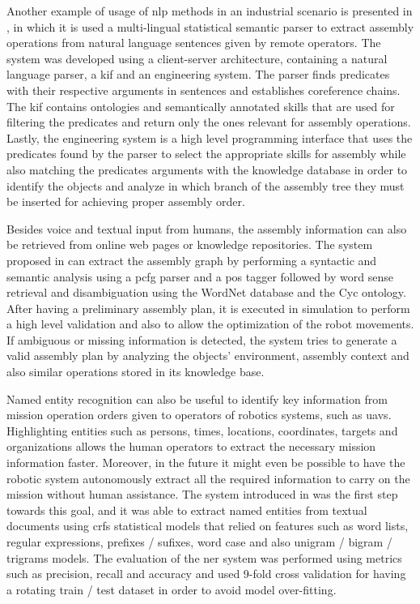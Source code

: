 Another example of usage of \gls{nlp} methods in an industrial scenario is presented in \cite{Stenmark2013}, in which it is used a multi-lingual statistical semantic parser to extract assembly operations from natural language sentences given by remote operators. The system was developed using a client-server architecture, containing a natural language parser, a \gls{kif} and an engineering system. The parser finds predicates with their respective arguments in sentences and establishes coreference chains. The \gls{kif} contains ontologies and semantically annotated skills that are used for filtering the predicates and return only the ones relevant for assembly operations. Lastly, the engineering system is a high level programming interface that uses the predicates found by the parser to select the appropriate skills for assembly while also matching the predicates arguments with the knowledge database in order to identify the objects and analyze in which branch of the assembly tree they must be inserted for achieving proper assembly order.

Besides voice and textual input from humans, the assembly information can also be retrieved from online web pages or knowledge repositories. The system proposed in \cite{Tenorth2010} can extract the assembly graph by performing a syntactic and semantic analysis using a \gls{pcfg} parser and a \gls{pos} tagger followed by word sense retrieval and disambiguation using the WordNet database and the Cyc ontology. After having a preliminary assembly plan, it is executed in simulation to perform a high level validation and also to allow the optimization of the robot movements. If ambiguous or missing information is detected, the system tries to generate a valid assembly plan by analyzing the objects' environment, assembly context and also similar operations stored in its knowledge base.

Named entity recognition can also be useful to identify key information from mission operation orders given to operators of robotics systems, such as \glspl{uav}. Highlighting entities such as persons, times, locations, coordinates, targets and organizations allows the human operators to extract the necessary mission information faster. Moreover, in the future it might even be possible to have the robotic system autonomously extract all the required information to carry on the mission without human assistance. The system introduced in \cite{Chesworth2016} was the first step towards this goal, and it was able to extract named entities from textual documents using \glspl{crf} statistical models that relied on features such as word lists, regular expressions, prefixes / sufixes, word case and also unigram / bigram / trigrams models. The evaluation of the \gls{ner} system was performed using metrics such as precision, recall and accuracy and used 9-fold cross validation for having a rotating train / test dataset in order to avoid model over-fitting.

